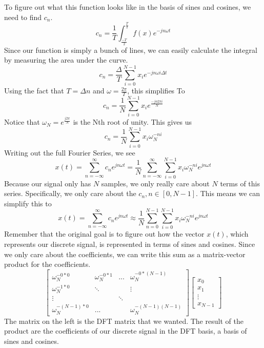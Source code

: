 \documentclass{article}
\begin{document}
To figure out what this function looks like in the basis of sines and cosines,
we need to find $c_n$.
$$c_n=\frac{1}{T}\int_{\frac{-T}{2}}^{\frac{T}{2}}{f(x)e^{-jn\omega t}}$$
Since our function is simply a bunch of lines, we can easily calculate the integral
by measuring the area under the curve.
$$c_n = \frac{\Delta}{T}\sum_{i=0}^{N-1}{x_i e^{-jn\omega i\Delta t}}$$
Using the fact that $T=\Delta n$ and $\omega = \frac{2\pi}{T}$, this simplifies To
$$c_n = \frac{1}{N}\sum_{i=0}^{N-1}{x_i e^{\frac{-jn 2\pi i}{N}}}$$
Notice that $\omega_N = e^{\frac{j2\pi}{N}}$ is the Nth root of unity. This gives us
$$c_n = \frac{1}{N}\sum_{i=0}^{N-1}{x_i \omega_N^{-ni}}$$
Writing out the full Fourier Series,
we see $$x(t) = \sum_{n=-\infty}^{\infty}{c_ne^{jn\omega t}} = \frac{1}{N}\sum_{n=-\infty}^{\infty}{\sum_{i=0}^{N-1}{x_i \omega_N^{-ni}}e^{jn\omega t}}$$
Because our signal only has $N$ samples, we only really care about $N$ terms of this series.
Specifically, we only care about the $c_n, n\in[0, N-1]$.
This means we can simplify this to $$x(t) = \sum_{n=-\infty}^{\infty}{c_ne^{jn\omega t}} \approx \frac{1}{N}\sum_{n=0}^{N-1}{\sum_{i=0}^{N-1}{x_i \omega_N^{-ni}}e^{jn\omega t}}$$
Remember that the original goal is to figure out how the vector $x(t)$, which represents our discrete signal,
is represented in terms of sines and cosines. Since we only care about the coefficients, we can write this sum as a matrix-vector product for the coefficients.
\[
    \left[
        \begin{array}{cccc}
            \omega_N^{-0*0} & \omega_N^{-0*1} & ... & \omega_N^{-0*(N-1)}\\
            \omega_N^{-1*0} & \ddots & & \vdots\\
            \vdots & & \ddots &\\
            \omega_N^{-(N-1)*0} & ... & & \omega_N^{-(N-1)(N-1)} 
    
        \end{array}
    \right]\left[
        \begin{array}{c}
            x_0\\
            x_1\\
            \vdots\\
            x_{N-1}
        \end{array}
    \right]
\]
The matrix on the left is the DFT matrix that we wanted.
The result of the product are the coefficients of our discrete signal 
in the DFT basis, a basis of sines and cosines.
\end{document}
